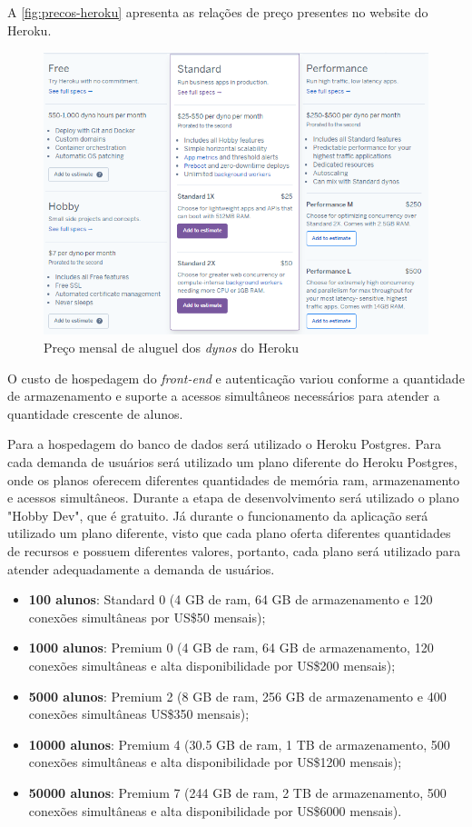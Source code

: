 \documentclass[
    12pt,               %
    openright,          %
    oneside,
    a4paper,            %
    english,            %
    brazil              %
    ]{ifsp-spo-inf-ctds} %
\begin{document}
A \autoref{fig:precos-heroku} apresenta as relações de preço presentes no website do Heroku.

\begin{figure}[htb]
    \centering
	\includegraphics[width=16cm]{imagens/precos-heroku.png}
	\caption{\label{fig:precos-heroku} Preço mensal de aluguel dos \textit{\glspl{dyno}} do Heroku}
\end{figure}

O custo de hospedagem do \textit{\gls{front-end}} e autenticação variou conforme a quantidade de armazenamento e suporte a acessos simultâneos necessários para atender a quantidade crescente de alunos.

Para a hospedagem do banco de dados será utilizado o Heroku Postgres. Para cada demanda de usuários será utilizado um plano diferente do Heroku Postgres, onde os planos oferecem diferentes quantidades de memória \ac{ram}, armazenamento e acessos simultâneos. Durante a etapa de desenvolvimento será utilizado o plano "Hobby Dev", que é gratuito. Já durante o funcionamento da aplicação será utilizado um plano diferente, visto que cada plano oferta diferentes quantidades de recursos e possuem diferentes valores, portanto, cada plano será utilizado para atender adequadamente a demanda de usuários.

\begin{itemize}
    \item \textbf{100 alunos}: Standard 0 (4 GB de \ac{ram}, 64 GB de armazenamento e 120 conexões simultâneas por US\$50 mensais);
    \item \textbf{1000 alunos}: Premium 0 (4 GB de \ac{ram}, 64 GB de armazenamento, 120 conexões simultâneas e alta disponibilidade por US\$200 mensais);
    \item \textbf{5000 alunos}: Premium 2 (8 GB de \ac{ram}, 256 GB de armazenamento e 400 conexões simultâneas US\$350 mensais);
    \item \textbf{10000 alunos}: Premium 4 (30.5 GB de \ac{ram}, 1 TB de armazenamento, 500 conexões simultâneas e alta disponibilidade por US\$1200 mensais);
    \item \textbf{50000 alunos}: Premium 7 (244 GB de \ac{ram}, 2 TB de armazenamento, 500 conexões simultâneas e alta disponibilidade por US\$6000 mensais).
\end{itemize}
\end{document}
